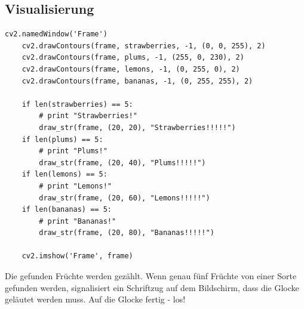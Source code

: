 \subsection{Visualisierung}
\lstset{language=Python}
\begin{lstlisting}[]
    cv2.namedWindow('Frame')
    cv2.drawContours(frame, strawberries, -1, (0, 0, 255), 2)
    cv2.drawContours(frame, plums, -1, (255, 0, 230), 2)
    cv2.drawContours(frame, lemons, -1, (0, 255, 0), 2)
    cv2.drawContours(frame, bananas, -1, (0, 255, 255), 2)

    if len(strawberries) == 5:
        # print "Strawberries!"
        draw_str(frame, (20, 20), "Strawberries!!!!!")
    if len(plums) == 5:
        # print "Plums!"
        draw_str(frame, (20, 40), "Plums!!!!!")
    if len(lemons) == 5:
        # print "Lemons!"
        draw_str(frame, (20, 60), "Lemons!!!!!")
    if len(bananas) == 5:
        # print "Bananas!"
        draw_str(frame, (20, 80), "Bananas!!!!!")

    cv2.imshow('Frame', frame)
\end{lstlisting}

Die gefunden Früchte werden gezählt. Wenn genau fünf Früchte von einer Sorte gefunden werden, signalisiert ein Schriftzug auf dem Bildschirm, dass die Glocke geläutet werden muss. Auf die Glocke fertig - los!

